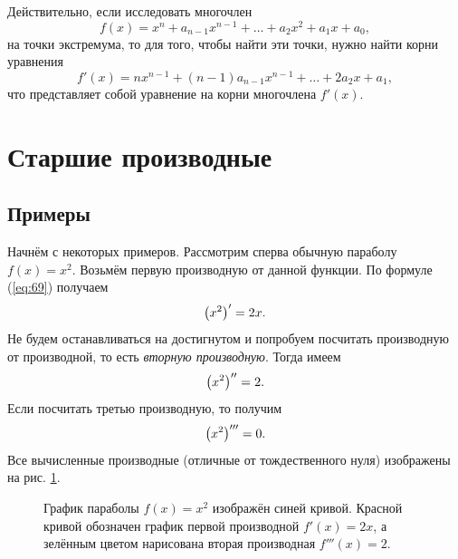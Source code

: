 \documentclass[12pt]{article}
\begin{document}
Действительно, если исследовать многочлен
\begin{equation}
	f(x) = x^n + a_{n-1}x^{n-1} + \ldots + a_2 x^2 + a_1 x + a_0,
\end{equation}
на точки экстремума, то для того, чтобы найти эти точки, нужно найти корни уравнения
\begin{equation}
	f'(x) = n x^{n-1} + (n-1)a_{n-1}x^{n-1} + \ldots + 2 a_2 x + a_1,
\end{equation}
что представляет собой уравнение на корни многочлена $f'(x)$.

\section{Старшие производные}
\subsection{Примеры}
Начнём с некоторых примеров. Рассмотрим сперва обычную параболу $f(x) = x^2$. Возьмём первую производную от данной функции. По формуле (\ref{eq:69}) получаем
\begin{equation}
	\qty(x^2)' = 2 x.
\end{equation}
Не будем останавливаться на достигнутом и попробуем посчитать производную от производной, то есть \emph{вторную производную}. Тогда имеем
\begin{equation}
	\qty(x^2)'' = 2.
\end{equation}
Если посчитать третью производную, то получим
\begin{equation}
	\qty(x^2)''' = 0.
\end{equation}
Все вычисленные производные (отличные от тождественного нуля) изображены на рис. \ref{fig:69}.

\begin{figure}[htbp]
\centering
{}
\caption{График параболы $f(x) = x^2$ изображён синей кривой. Красной кривой обозначен график первой производной $f'(x) = 2x$, а зелённым цветом нарисована вторая производная $f'''(x)=2$.}
\label{fig:69}
\end{figure}
\end{document}
